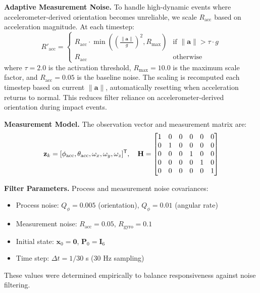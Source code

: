 \textbf{Adaptive Measurement Noise.} To handle high-dynamic events where accelerometer-derived orientation becomes unreliable, we scale $R_\text{acc}$ based on acceleration magnitude. At each timestep:
\begin{equation}
R'_\text{acc} = \begin{cases}
R_\text{acc} \cdot \min\left(\left(\frac{\|\mathbf{a}\|}{g}\right)^2, R_\text{max}\right) & \text{if } \|\mathbf{a}\| > \tau \cdot g \\
R_\text{acc} & \text{otherwise}
\end{cases}
\end{equation}
where $\tau = 2.0$ is the activation threshold, $R_\text{max} = 10.0$ is the maximum scale factor, and $R_\text{acc} = 0.05$ is the baseline noise. The scaling is recomputed each timestep based on current $\|\mathbf{a}\|$, automatically resetting when acceleration returns to normal. This reduces filter reliance on accelerometer-derived orientation during impact events.

\textbf{Measurement Model.} The observation vector and measurement matrix are:
\begin{equation}
\mathbf{z}_k = [\phi_\text{acc}, \theta_\text{acc}, \omega_x, \omega_y, \omega_z]^{\mathsf{T}}, \quad
\mathbf{H} = \begin{bmatrix} 1 & 0 & 0 & 0 & 0 & 0 \\ 0 & 1 & 0 & 0 & 0 & 0 \\ 0 & 0 & 0 & 1 & 0 & 0 \\ 0 & 0 & 0 & 0 & 1 & 0 \\ 0 & 0 & 0 & 0 & 0 & 1 \end{bmatrix}
\end{equation}

\textbf{Filter Parameters.} Process and measurement noise covariances:
\begin{itemize}
    \item Process noise: $Q_\phi = 0.005$ (orientation), $Q_{\dot\phi} = 0.01$ (angular rate)
    \item Measurement noise: $R_\text{acc} = 0.05$, $R_\text{gyro} = 0.1$
    \item Initial state: $\mathbf{x}_0 = \mathbf{0}$, $\mathbf{P}_0 = \mathbf{I}_6$
    \item Time step: $\Delta t = 1/30$ s (30 Hz sampling)
\end{itemize}
These values were determined empirically to balance responsiveness against noise filtering.

